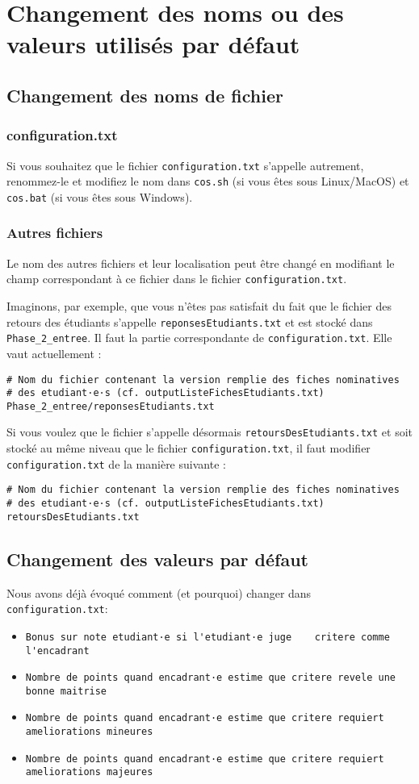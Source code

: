 \documentclass[11pt]{article}
\begin{document}
\section{Changement des noms ou des valeurs utilisés par défaut}
\label{sec-7}
\subsection{Changement des noms de fichier}
\label{sec-7-1}
\subsubsection{configuration.txt}
\label{sec-7-1-1}
Si vous souhaitez que le fichier \verb~configuration.txt~ s'appelle
autrement, renommez-le et modifiez le nom dans \verb~cos.sh~ (si vous êtes
sous Linux/MacOS) et \verb~cos.bat~ (si vous êtes sous Windows).
\subsubsection{Autres fichiers}
\label{sec-7-1-2}
Le nom des autres fichiers et leur localisation peut être changé en
modifiant le champ correspondant à ce fichier dans le fichier
\verb~configuration.txt~.

Imaginons, par exemple, que vous n'êtes pas satisfait du fait que le
fichier des retours des étudiants s'appelle \verb~reponsesEtudiants.txt~ et
est stocké dans \verb~Phase_2_entree~. Il faut la partie correspondante de
\verb~configuration.txt~. Elle vaut actuellement :
\begin{verbatim}
# Nom du fichier contenant la version remplie des fiches nominatives
# des etudiant·e·s (cf. outputListeFichesEtudiants.txt)
Phase_2_entree/reponsesEtudiants.txt
\end{verbatim}

Si vous voulez que le fichier s'appelle désormais
\verb~retoursDesEtudiants.txt~ et soit stocké au même niveau que le fichier
\verb~configuration.txt~, il faut modifier \verb~configuration.txt~ de la
manière suivante :
\begin{verbatim}
# Nom du fichier contenant la version remplie des fiches nominatives
# des etudiant·e·s (cf. outputListeFichesEtudiants.txt)
retoursDesEtudiants.txt
\end{verbatim}
\subsection{Changement des valeurs par défaut}
\label{sec-7-2}
Nous avons déjà évoqué comment (et pourquoi) changer dans
\verb~configuration.txt~:
\begin{itemize}
\item \verb~Bonus sur note etudiant·e si l'etudiant·e juge    critere comme l'encadrant~
\item \verb~Nombre de points quand encadrant·e estime que critere revele une bonne maitrise~
\item \verb~Nombre de points quand encadrant·e estime que critere requiert ameliorations mineures~
\item \verb~Nombre de points quand encadrant·e estime que critere requiert ameliorations majeures~
\end{itemize}
\end{document}
